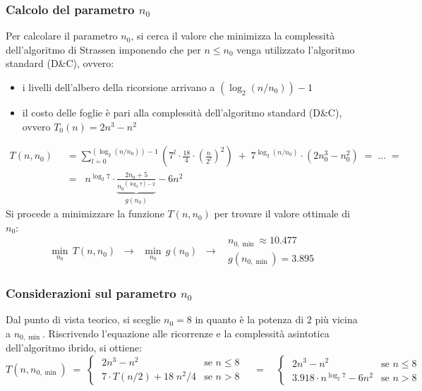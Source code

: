 \subsubsection*{Calcolo del parametro \(n_0\)}
Per calcolare il parametro \(n_0\), si cerca il valore che minimizza la complessità dell'algoritmo di Strassen imponendo
che per \(n \leq n_0\) venga utilizzato l'algoritmo standard (D\&C), ovvero:
\begin{itemize}
	\item i livelli dell'albero della ricorsione arrivano a \((\log_2 (n/n_0)) - 1\)
	\item il costo delle foglie è pari alla complessità dell'algoritmo standard (D\&C), ovvero \(T_0(n) = 2n^3 - n^2\)
\end{itemize}
\begin{align*}
	T(n, n_0) \;\; &= \sum_{l=0}^{(\log_2 (n/n_0)) - 1} \!\! \left( 7^l \cdot \frac{18}{4} \cdot \left( \frac{n}{2^l} \right)^2 \right) \; + \; 7^{\log_2 (n/n_0)} \cdot \left( 2n_0^3 - n_0^2 \right) \; = \; \dots \; = \\[3pt]
	&= \;\; n^{\log_2 7} \cdot \underbrace{\frac{2 n_0 + 5}{{n_0}^{(\log_2 7) - 2}}}_{g(n_0)} - 6n^2
\end{align*}
Si procede a minimizzare la funzione \(T(n, n_0)\) per trovare il valore ottimale di \(n_0\):
\vspace{-5pt}
\[\min_{n_0} \, T(n, n_0) \;\; \longrightarrow \;\; \min_{n_0} \, g(n_0) \;\; \longrightarrow \;\; \begin{array}{l} n_{0, \min} \approx 10.477 \\[3pt] g(n_{0, \min}) = 3.895 \end{array}\]

\subsubsection*{Considerazioni sul parametro \(n_0\)}
Dal punto di vista teorico, si sceglie \(n_0 = 8\) in quanto è la potenza di 2 più vicina a \(n_{0, \min}\). Riscrivendo
l'equazione alle ricorrenze e la complessità asintotica dell'algoritmo ibrido, si ottiene:
\[T(n, n_{0, \min}) \; = \; \begin{cases}
	\; 2n^3 - n^2 & \text{se } n \leq 8 \\[3pt]
	\; 7 \cdot T(n/2) + 18 \; n^2/4 & \text{se } n > 8
\end{cases} \quad = \quad \begin{cases}
	\; 2n^3 - n^2 & \text{se } n \leq 8 \\[3pt]
	\; 3.918 \cdot n^{\log_2 7} - 6n^2 & \text{se } n > 8
\end{cases}\]

